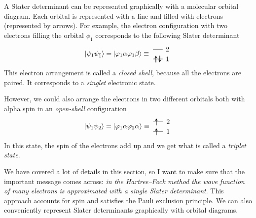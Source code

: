 \documentclass[../Main/notes.tex]{subfiles}
\begin{document}
A Stater determinant can be represented graphically with a molecular orbital diagram. Each orbital is represented with a line and filled with electrons (represented by arrows).
For example, the electron configuration with two electrons filling the orbital $\phi_1$ corresponds to the following Slater determinant
\begin{equation}
\ket{\psi_1 \psi_{\bar{1}}} = 
\ket{\varphi_1 \alpha \varphi_1 \beta }
\equiv \;
\begin{tikzpicture}[baseline={([yshift=-.5ex]current bounding box.center)},]
    \draw (0,0.5) -- (0.5,0.5);
    \draw[thick,->,>=stealth] (0.15,0.325) -- (0.15,0.675);    
    \draw[thick,<-,>=stealth] (0.35,0.325) -- (0.35,0.675);    
    \draw (0,1.0) -- (0.5,1.0);
    \draw (0.75,0.5) node{1};
    \draw (0.75,1.0) node{2};
\end{tikzpicture}
\end{equation}
This electron arrangement is called a \emph{closed shell}, because all the electrons are paired. It corresponds to a \emph{singlet} electronic state.

However, we could also arrange the electrons in two different orbitals both with alpha spin in an \emph{open-shell} configuration
\begin{equation}
\ket{\psi_1 \psi_2}= 
\ket{\varphi_1 \alpha \varphi_2\alpha}
\equiv \;
\begin{tikzpicture}[baseline={([yshift=-.5ex]current bounding box.center)},]
    \draw (0,0.5) -- (0.5,0.5);
    \draw[thick,->,>=stealth] (0.15,0.325) -- (0.15,0.675);    
    \draw[thick,->,>=stealth] (0.15,0.825) -- (0.15,1.175);        
    \draw (0,1.0) -- (0.5,1.0);
    \draw (0.75,0.5) node{1};
    \draw (0.75,1.0) node{2};
\end{tikzpicture}
\end{equation}
In this state, the spin of the electrons add up and we get what is called a \emph{triplet state}.

We have covered a lot of details in this section, so I want to make sure that the important message comes across: \emph{in the Hartree--Fock method the wave function of many electrons is approximated with a single Slater determinant}.
This approach accounts for spin and satisfies the Pauli exclusion principle.
We can also conveniently represent Slater determinants graphically with orbital diagrams.
\end{document}
